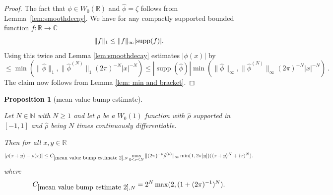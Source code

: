 \documentclass[12pt,reqno]{amsart}
\theoremstyle{plain}
\newtheorem{proposition}[theorem]{Proposition}
\numberwithin{equation}{section}
\theoremstyle{remark}
\newcommand{\uses}[1]{}
\newcommand{\usesdefs}[1]{}
\newcommand{\leanok}{}
\newcommand{\lean}[1]{}
\newcommand{\R}{{\mathbb R}}
\newcommand{\C}{{\mathbb C}}
\DeclareMathOperator{\supp}{supp}
\begin{document}
\begin{proof}
The fact that $\phi \in W_0(\R)$ and $\widehat{\phi}=\zeta$ follows from Lemma~\ref{lem:smoothdecay}.
We have for any compactly supported bounded function $f:\R\to\C$
  \[\|f\|_1 \le \|f\|_\infty |\textup{supp}(f)| .\]
Using this twice and Lemma \ref{lem:smoothdecay} estimates $|\phi(x)|$ by
\[\le \min(\|\widehat{\phi}\|_1, \|\widehat{\phi}^{(N)}\|_1 (2\pi)^{-N} |x|^{-N})
\le |\supp (\widehat{\phi})| \min(\|\widehat{\phi}\|_\infty, \|\widehat{\phi}^{(N)}\|_\infty (2\pi)^{-N} |x|^{-N})\, . \]
  The claim now follows from Lemma \ref{lem: min and bracket}.
\end{proof}

\begin{proposition}[mean value bump estimate]\label{mean value bump estimate 2}\uses{lem:smoothdecay2,lem: min and bracket}\usesdefs{bracket bump,auto:Wiener-space-definition}
\lean{Auto.meanValueBumpEstimate}
\leanok
Let $N\in\mathbb N$ with $N\ge1$ and let $\rho$ be a $W_0(1)$ function with
$\widehat{\rho}$ supported in $[-1,1]$ and $\widehat{\rho}$ being $N$ times continuously differentiable.

Then for all $x,y\in\mathbb{R}$
\begin{equation}\label{auto:mean-value-bump-bound} |\rho(x+y)-\rho(x)| \le C_{\ref{mean value bump estimate 2},N}\max_{0\le \nu\le N}\|(2\pi)^{-\nu}\widehat{\rho}^{(\nu)}\|_\infty \min(1, 2\pi |y|) (\langle x+y\rangle^N + \langle x\rangle^N). \end{equation}
where
\begin{equation}\label{auto:mean-value-bump-constant-definition}
C_{\ref{mean value bump estimate 2},N}=2^N\max(2,(1+(2\pi)^{-1})^N).
\end{equation}


\end{proposition}
\end{document}
